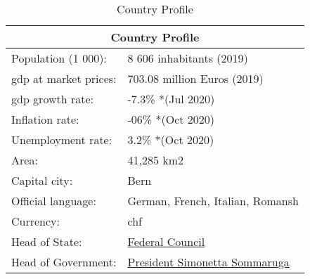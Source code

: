 \begin{table}[h!]
\centering
\begin{tabular}{|l|l|}
\hline
\multicolumn{2}{|c|}{\textbf{Country Profile}}                    \\ \hline
Population (1 000):   & 8 606 inhabitants (2019)         \\ \hline
\acrshort{gdp} at market prices: & 703.08 million Euros (2019)      \\ \hline
\acrshort{gdp} growth rate:      & -7.3\% *(Jul 2020)               \\ \hline
Inflation rate:       & -06\% *(Oct 2020)                \\ \hline
Unemployment rate:    & 3.2\% *(Oct 2020)                \\ \hline
Area:                 & 41,285 km2                       \\ \hline
Capital city:         & Bern                             \\ \hline
Official language:    & German, French, Italian, Romansh \\ \hline
Currency:             & \acrfull{chf}                             \\ \hline
Head of State: & \href{https://www.admin.ch/gov/en/start/federal-council.html}{Federal Council}\cite{federalcouncil} \\ \hline
Head of Government: & \href{https://www.admin.ch/gov/en/start/departments/department-of-environment-transport-energy-communications-detec.html}{President Simonetta Sommaruga}\cite{simonetta} \\ \hline
\end{tabular}
\caption{Country Profile}
\label{tab: profile}
\end{table}

